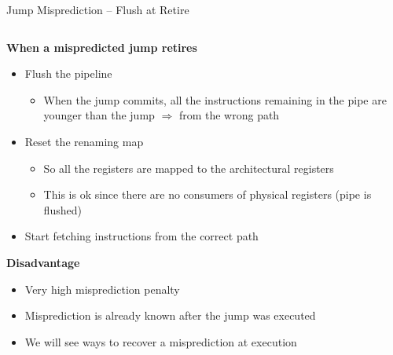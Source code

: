 \documentclass[aspectratio=169,12pt]{beamer}
\begin{document}
\begin{frame}{Jump Misprediction -- Flush at Retire}
    \centering
    
    \begin{columns}[T]
        \begin{column}{0.9\textwidth}
            \textbf{When a mispredicted jump retires}
            \begin{itemize}
                \item Flush the pipeline
                \begin{itemize}
                    \item When the jump commits, all the instructions remaining in the pipe are younger than the jump $\Rightarrow$ from the wrong path
                \end{itemize}
                \item Reset the renaming map
                \begin{itemize}
                    \item So all the registers are mapped to the architectural registers
                    \item This is ok since there are no consumers of physical registers (pipe is flushed)
                \end{itemize}
                \item Start fetching instructions from the correct path
            \end{itemize}
            
            \vspace{0.3cm}
            \textbf{Disadvantage}
            \begin{itemize}
                \item Very high misprediction penalty
                \item Misprediction is already known after the jump was executed
                \item We will see ways to recover a misprediction at execution
            \end{itemize}
        \end{column}
    \end{columns}
\end{frame}
\end{document}
